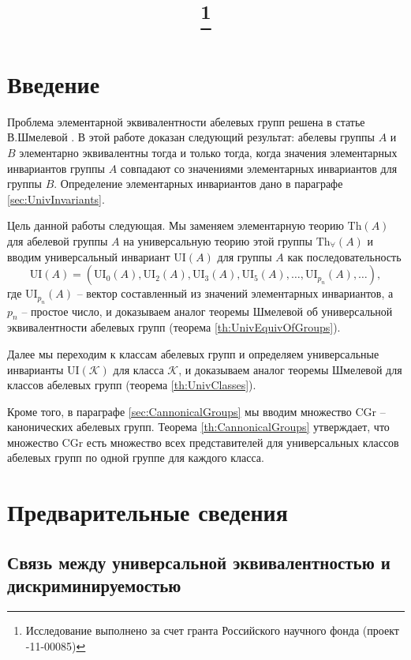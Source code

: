 \documentclass[a4paper,11pt,twoside]{article}
\title{\titles\footnote{Исследование выполнено за счет гранта Российского научного фонда (проект \No 14-11-00085)}}
\author{\authors}
\gdef\firstpage{1}
\def\K{{\mathcal{K}}}
\def\Th{{\mathrm{Th}}}
\def\Tha{{\mathrm{Th}_\forall}}
\def\CG{{\mathrm{CGr}}}
\def\ui{{\mathrm{UI}}}
\begin{document}
\maketitle

\tableofcontents


\setcounter{page}{\firstpage}
\pagestyle{newpstyle}

\Russian
\sloppy
\rm

\section{Введение}

Проблема элементарной эквивалентности абелевых групп решена в статье В.Шмелевой \cite{Szm}. В этой работе доказан следующий результат: абелевы группы $A$ и $B$ элементарно эквивалентны тогда и только тогда, когда значения элементарных инвариантов группы $A$ совпадают со значениями элементарных инвариантов для группы $B$. Определение элементарных инвариантов дано в параграфе \ref{sec:UnivInvariants}.

Цель данной работы следующая. Мы заменяем элементарную теорию $\Th(A)$ для абелевой группы $A$ на универсальную теорию этой группы $\Tha(A)$ и вводим универсальный инвариант $\ui(A)$ для группы $A$ как последовательность 
$$\ui(A) = (\ui_0(A), \ui_2(A), \ui_3(A), \ui_5(A), \ldots, \ui_{p_n}(A), \ldots ),$$
где $\ui_{p_n}(A)$ -- вектор составленный из значений элементарных инвариантов, а $p_n$ -- простое число, и доказываем аналог теоремы Шмелевой об универсальной эквивалентности абелевых групп (теорема \ref{th:UnivEquivOfGroups}).

Далее мы переходим к классам абелевых групп и определяем универсальные инварианты $\ui(\K)$ для класса $\K$, и доказываем аналог теоремы Шмелевой для классов абелевых групп (теорема \ref{th:UnivClasses}).

Кроме того, в параграфе \ref{sec:CannonicalGroups} мы вводим множество $\CG$ -- канонических абелевых групп. Теорема \ref{th:CannonicalGroups} утверждает, что множество $\CG$ есть множество всех представителей для универсальных классов абелевых групп по одной группе для каждого класса. 

\section{Предварительные сведения}

\subsection{Связь между универсальной эквивалентностью и дискриминируемостью}
\end{document}

